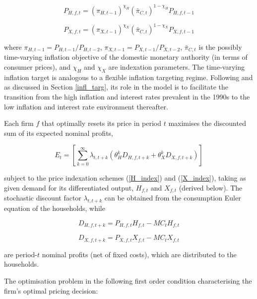 \documentclass[a4paper,11pt]{article}
\numberwithin{equation}{section}
\begin{document}
	\begin{equation} \label{H_index}
	P_{H,f,t}=\left(\pi_{H,t-1}\right)^{\chi_H}\left(\bar{\pi}_{C,t}\right)^{1-\chi_H}P_{H,f,t-1}
	\end{equation}  
	
	\begin{equation} \label{X_index}
	P_{X,f,t}=\left(\pi_{X,t-1}\right)^{\chi_X}\left(\bar{\pi}_{C,t}\right)^{1-\chi_X}P_{X,f,t-1}
	\end{equation}
	
	where $\pi_{H,t-1}=P_{H,t-1}/P_{H,t-2}$, $\pi_{X,t-1}=P_{X,t-1}/P_{X,t-2}$, $\bar{\pi}_{C,t}$ is the possibly time-varying inflation objective of the domestic monetary authority (in terms of consumer prices), and $\chi_H$ and $\chi_X$ are indexation parameters. The time-varying inflation target is analogous to a flexible inflation targeting regime. Following \cite{steinbach2014} and as discussed in Section \ref{infl_targ}, its role in the model is to facilitate the transition from the high inflation and interest rates prevalent in the 1990s to the low inflation and interest rate environment thereafter.
	
	Each firm $f$ that optimally resets its price in period $t$ maximises the discounted sum of its expected nominal profits,
	
	\begin{equation}
	E_t=\left[\sum_{k=0}^{\infty}\lambda_{t,t+k}\left(\theta^k_HD_{H,f,t+k}+\theta^k_XD_{X,f,t+k}\right)\right]
	\end{equation}
	
	subject to the price indexation schemes (\ref{H_index}) and (\ref{X_index}), taking as given demand for its differentiated output, $H_{f,t}$ and $X_{f,t}$ (derived below). The stochastic discount factor $\lambda_{t,t+k}$ can be obtained from the consumption Euler equation of the households, while
	
	\begin{equation} \label{H_profit}
	D_{H,f,t+k}=P_{H,f,t}H_{f,t}-MC_tH_{f,t}
	\end{equation}
	
	\begin{equation} \label{X_profit}
	D_{X,f,t+k}=P_{X,f,t}X_{f,t}-MC_tX_{f,t}
	\end{equation}
	
	are period-$t$ nominal profits (net of fixed costs), which are distributed to the households. 
	
	The optimisation problem in the following first order condition characterising the firm's optimal pricing decision:
	
\end{document}

